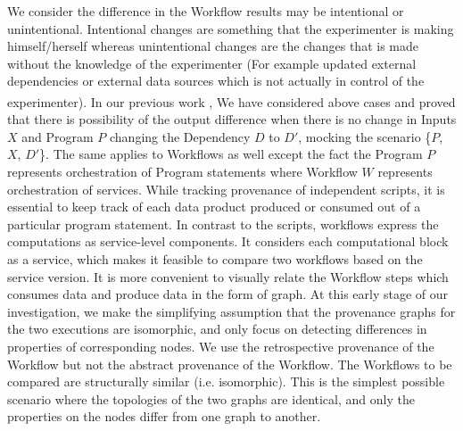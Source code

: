 \documentclass[10pt,conference,twocolumn]{IEEEtran}
\begin{document}
We consider the difference in the Workflow results may be intentional or unintentional. Intentional changes are something that the experimenter is making himself/herself whereas unintentional changes are the changes that is made without the knowledge of the experimenter (For example updated external dependencies or external data sources which is not actually in control of the experimenter). In our previous work \textsuperscript{\cite{thavasimani2016}}, We have considered above cases and proved that there is possibility of the output difference when there is no change in Inputs $X$ and Program $P$ changing the Dependency $D$ to $D'$, mocking the scenario \{$P$, $X$, $D'$\}. The same applies to Workflows as well except the fact the Program $P$ represents orchestration of Program statements where Workflow $W$ represents orchestration of services. While tracking provenance of independent scripts, it is essential to keep track of each data product produced or consumed out of a particular program statement. In contrast to the scripts, workflows express the computations as service-level components. It considers each computational block as a service, which makes it feasible to compare two workflows based on the service version. It is more convenient to visually relate the Workflow steps which consumes data and produce data in the form of graph. At this early stage of our investigation, we make the simplifying assumption that the provenance graphs for the two executions are isomorphic, and only focus on detecting differences in properties of corresponding nodes. We use the retrospective provenance of the Workflow but not the abstract provenance of the Workflow. The Workflows to be compared are structurally similar (i.e. isomorphic). This is the simplest possible scenario where the topologies of the two graphs are identical, and only the properties on the nodes differ from one graph to another. 
\end{document}

